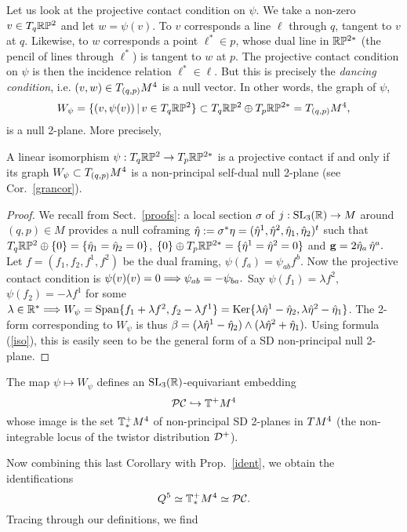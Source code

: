 Let us look at  the projective contact condition on $\psi$. We take a non-zero $v\in T_q\mathbb{R}\mathbb{P}^2$ and let $w=\psi(v)$.  To $v$ corresponds a line $\ell$ through $q$, tangent to $v$ at $q$. Likewise, to $w$ corresponds a point  $\ell^*\in p$, whose dual line in $\mathbb{R}\mathbb{P}^{2*}$ (the pencil of lines through $\ell^*$) is tangent to $w$ at $p$. The projective contact condition on $\psi$ is then the incidence relation  $\ell^*\in \ell$. But this is precisely the {\em dancing condition}, i.e. $(v,w)\in T_{(q,p)}M^4$ is a null vector. In other words, the graph of $\psi$,
$$W_\psi=\{(v, \psi (v))\, | \, v\in T_q\mathbb{R}\mathbb{P}^2\}\subset T_q\mathbb{R}\mathbb{P}^2\oplus T_p\mathbb{R}\mathbb{P}^{2*}=T_{(q,p)}M^4,$$
is a null 2-plane. More precisely,


\begin{proposition}
A linear isomorphism $\psi:T_q\mathbb{R}\mathbb{P}^2\to T_p\mathbb{R}\mathbb{P}^{2*}$ is a projective contact if and only if its graph $W_\psi\subset T_{(q,p)}M^4$ is a non-principal self-dual null 2-plane (see Cor.~\ref{grancor}). 
\end{proposition}

\begin{proof} We recall from Sect.~\ref{proofs}: a local section $\sigma$ of   $j:{\mathrm{SL}_3(\mathbb{R})}\to M$ around $(q,p)\in M$ provides  a null coframing
$\hat\eta:=\sigma^*\eta=(\hat\eta^1, \hat\eta^2, \hat\eta_1, \hat\eta_2)^t$ such  that $T_q\mathbb{R}\mathbb{P}^2\oplus\{0\}=\{ \hat\eta_1= \hat\eta_2=0\}$,  
$\{0\}\oplus T_p\mathbb{R}\mathbb{P}^{2*}=\{ \hat\eta^1= \hat\eta^2=0\}$  and
$\mathbf{ g}=2\hat\eta_a\,\hat\eta^a.$ 
Let  
$f=(f_1, f_2, f^1, f^2)$ be the dual framing, $\psi(f_a)=\psi_{ab}f^b.$ Now   the projective contact condition is $\psi(v)(v)=0\Longrightarrow \psi_{ab}=-\psi_{ba}.$ Say $\psi(f_1)=\lambda f^2,$ $\psi(f_2)=-\lambda f^1$ for some $\lambda\in\mathbb{R}^*\Longrightarrow  W_\psi=\mathrm{Span}\{f_1+\lambda f^2, f_2-\lambda f^1\}={\rm Ker}\{\lambda\hat\eta^1-\hat\eta_2, \lambda\hat\eta^2-\hat\eta_1\}$. The 2-form corresponding to $W_\psi$  is thus $\beta=(\lambda\hat\eta^1-\hat\eta_2)\wedge(\lambda\hat\eta^2+\hat\eta_1).$ Using formula (\ref{iso}), this is easily seen to be the general form of a SD non-principal null 2-plane. \end{proof} 




\begin{cor} The map $\psi\mapsto W_\psi$ defines an ${\mathrm{SL}_3(\mathbb{R})}$-equivariant embedding 
$$\mathcal{PC}\hookrightarrow \mathbb{T}^+M^4$$ 
whose image is the set $\mathbb{T}^+_*M^4$ of non-principal SD 2-planes in $TM^4$ (the non-integrable locus of the twistor distribution ${\mathcal D}^+$).  
\end{cor}

Now combining this last Corollary  with  Prop.~\ref{ident}, we obtain the 
identifications
$$Q^5 \simeq\mathbb{T}^+_*M^4\simeq\mathcal{PC}.$$
Tracing through our definitions, we find 


